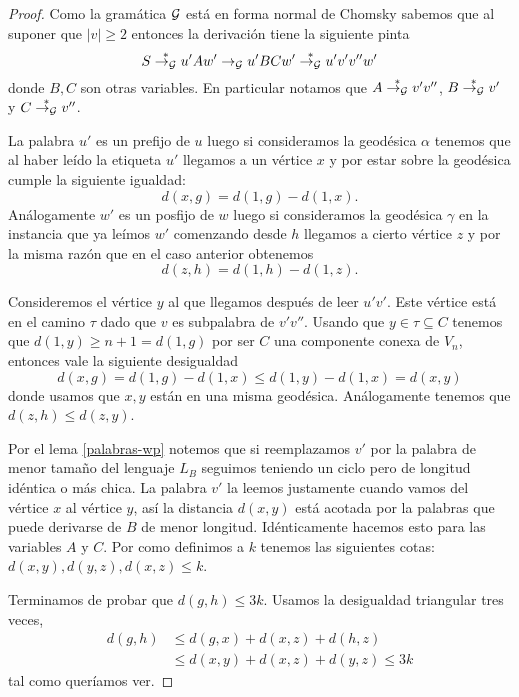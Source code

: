 \documentclass[tesis.tex]{subfiles}
\begin{document}
\begin{proof}
	Como la gramática $ {\cal G} $ está en forma normal de Chomsky sabemos que al suponer que $|v| \ge 2$ entonces la derivación tiene la siguiente pinta
	\begin{equation*}
		S \overset{*}{\to_{\cal G}} u'Aw' \to_{\cal G} u'BC w' \overset{*}{\to_{\cal G}} u'v'v''w'
	\end{equation*}
	donde $B,C$ son otras variables. 
	En particular notamos que $A \overset{*}{\to_{\cal G}} v'v''$, $B \overset{*}{\to_{\cal G}} v'$ y $C \overset{*}{\to_{\cal G}} v''$.
	
	
	La palabra $u'$ es un prefijo de $u$ luego si consideramos la geodésica $\alpha$ tenemos que al haber leído la etiqueta $u'$ llegamos a un vértice $x$ y por estar sobre la geodésica cumple la siguiente igualdad:
	\begin{equation*}
		d(x,g) = d(1,g) - d(1,x).
	\end{equation*}
	Análogamente $w'$ es un posfijo de $w$ luego si consideramos la geodésica $\gamma$ en la instancia que ya leímos $w'$ comenzando desde $h$ llegamos a cierto vértice $z$ y por la misma razón que en el caso anterior obtenemos
	\begin{equation*}
		d(z,h) = d(1,h) - d(1,z).
	\end{equation*}

	Consideremos el vértice $y$ al que llegamos después de leer $u'v'$.
	Este vértice está en el camino $\tau$ dado que $v$ es subpalabra de $v'v''$.
	Usando que $y \in \tau \subseteq C $ tenemos que $d(1,y) \ge n+1 = d(1,g)$ por ser $C$ una componente conexa de $V_n$, entonces vale la siguiente desigualdad
	\begin{equation*}
		d(x,g) = d(1,g) - d(1,x) \le d(1,y) - d(1,x) = d(x,y)
	\end{equation*}
	donde usamos que $x,y$ están en una misma geodésica.
	Análogamente tenemos que $d(z,h) \le d(z,y)$.
	
	
	Por el lema \ref{palabras-wp} notemos que si reemplazamos $v'$ por la palabra de menor tamaño del lenguaje $L_B$ seguimos teniendo un ciclo pero de longitud idéntica o más chica. 
	La palabra $v'$ la leemos justamente cuando vamos del vértice $x$ al vértice $y$, así la distancia  $d(x,y)$ está acotada por la palabras que puede derivarse de $B$ de menor longitud. 
	Idénticamente hacemos esto para las variables $A$ y $C$.
	Por como definimos a $k$ tenemos las siguientes cotas: 
	$d(x,y), d(y,z), d(x,z) \le k$.

	
	Terminamos de probar que $d(g,h) \le 3k$. 
	Usamos la desigualdad triangular tres veces,
	\begin{align*}
		d(g,h) & \le d(g,x) + d(x,z) + d(h,z) \\
		& \le d(x,y) + d(x,z) + d(y,z) \le 3k
	\end{align*}
	tal como queríamos ver.
	
\end{proof}	
\end{document}
